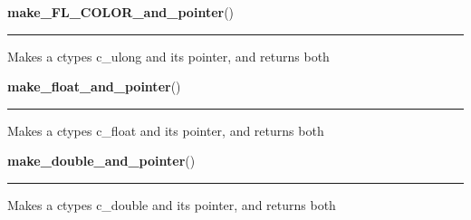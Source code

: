     \label{xformslib:library:make_ulong_and_pointer}

    \vspace{0.5ex}

\hspace{.8\funcindent}\begin{boxedminipage}{\funcwidth}

    \raggedright \textbf{make\_FL\_COLOR\_and\_pointer}()

    \vspace{-1.5ex}

    \rule{\textwidth}{0.5\fboxrule}
\setlength{\parskip}{2ex}

Makes a ctypes c\_ulong and its pointer, and returns both
\setlength{\parskip}{1ex}
    \end{boxedminipage}

    \label{xformslib:library:make_float_and_pointer}

    \vspace{0.5ex}

\hspace{.8\funcindent}\begin{boxedminipage}{\funcwidth}

    \raggedright \textbf{make\_float\_and\_pointer}()

    \vspace{-1.5ex}

    \rule{\textwidth}{0.5\fboxrule}
\setlength{\parskip}{2ex}

Makes a ctypes c\_float and its pointer, and returns both
\setlength{\parskip}{1ex}
    \end{boxedminipage}

    \label{xformslib:library:make_double_and_pointer}

    \vspace{0.5ex}

\hspace{.8\funcindent}\begin{boxedminipage}{\funcwidth}

    \raggedright \textbf{make\_double\_and\_pointer}()

    \vspace{-1.5ex}

    \rule{\textwidth}{0.5\fboxrule}
\setlength{\parskip}{2ex}

Makes a ctypes c\_double and its pointer, and returns both
\setlength{\parskip}{1ex}
    \end{boxedminipage}

